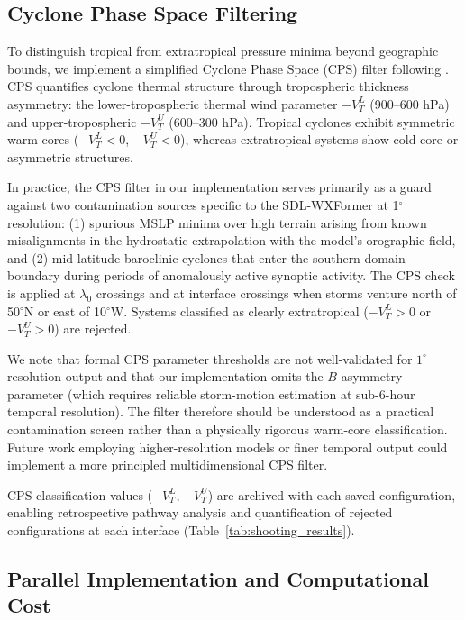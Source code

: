 \documentclass[11pt]{article}
\begin{document}
\subsection{Cyclone Phase Space Filtering}

To distinguish tropical from extratropical pressure minima beyond geographic bounds, we implement a simplified Cyclone Phase Space (CPS) filter following \citet{hart2003cyclone}. CPS quantifies cyclone thermal structure through tropospheric thickness asymmetry: the lower-tropospheric thermal wind parameter $-V_T^L$ (900--600 hPa) and upper-tropospheric $-V_T^U$ (600--300 hPa). Tropical cyclones exhibit symmetric warm cores ($-V_T^L < 0$, $-V_T^U < 0$), whereas extratropical systems show cold-core or asymmetric structures.

In practice, the CPS filter in our implementation serves primarily as a guard against two contamination sources specific to the SDL-WXFormer at 1$^\circ$ resolution: (1) spurious MSLP minima over high terrain arising from known misalignments in the hydrostatic extrapolation with the model's orographic field, and (2) mid-latitude baroclinic cyclones that enter the southern domain boundary during periods of anomalously active synoptic activity. The CPS check is applied at $\lambda_0$ crossings and at interface crossings when storms venture north of 50$^\circ$N or east of 10$^\circ$W. Systems classified as clearly extratropical ($-V_T^L > 0$ or $-V_T^U > 0$) are rejected.

We note that formal CPS parameter thresholds are not well-validated for $1^\circ$ resolution output and that our implementation omits the $B$ asymmetry parameter (which requires reliable storm-motion estimation at sub-6-hour temporal resolution). The filter therefore should be understood as a practical contamination screen rather than a physically rigorous warm-core classification. Future work employing higher-resolution models or finer temporal output could implement a more principled multidimensional CPS filter.

CPS classification values ($-V_T^L$, $-V_T^U$) are archived with each saved configuration, enabling retrospective pathway analysis and quantification of rejected configurations at each interface (Table~\ref{tab:shooting_results}).

\subsection{Parallel Implementation and Computational Cost}
\end{document}
